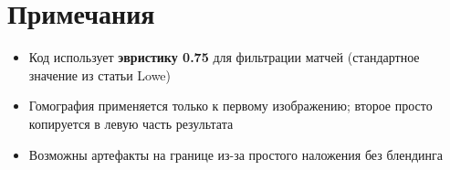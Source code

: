 \documentclass[a4paper,14pt]{extarticle}
\begin{document}
\section{Примечания}
\begin{itemize}
\item Код использует \textbf{эвристику 0.75} для фильтрации матчей (стандартное значение из статьи Lowe)
\item Гомография применяется только к первому изображению; второе просто копируется в левую часть результата
\item Возможны артефакты на границе из-за простого наложения без блендинга
\end{itemize}
\end{document}

